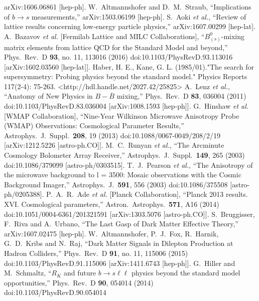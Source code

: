\begin{thebibliography}{xxx}
  arXiv:1606.06861 [hep-ph].
  W.~Altmannshofer and D.~M.~Straub,
  ``Implications of $b\to s$ measurements,''
  arXiv:1503.06199 [hep-ph].
  S.~Aoki {\it et al.},
  ``Review of lattice results concerning low-energy particle physics,''
  arXiv:1607.00299 [hep-lat]. 
  A.~Bazavov {\it et al.} [Fermilab Lattice and MILC Collaborations],
  ``$B^0_{(s)}$-mixing matrix elements from lattice QCD for the Standard Model and beyond,''
  Phys.\ Rev.\ D {\bf 93}, no. 11, 113016 (2016)
  doi:10.1103/PhysRevD.93.113016
  [arXiv:1602.03560 [hep-lat]].
  Haber, H. E., Kane, G. L. (1985/01)."The search for supersymmetry: Probing physics beyond the standard model." Physics Reports 117(2-4): 75-263. <http://hdl.handle.net/2027.42/25825>
  A.~Lenz {\it et al.},
  ``Anatomy of New Physics in $B - \bar{B}$ mixing,''
  Phys.\ Rev.\ D {\bf 83}, 036004 (2011)
  doi:10.1103/PhysRevD.83.036004
  [arXiv:1008.1593 [hep-ph]]. 
  G.~Hinshaw {\it et al.} [WMAP Collaboration],
  ``Nine-Year Wilkinson Microwave Anisotropy Probe (WMAP) Observations: Cosmological Parameter Results,''
  Astrophys.\ J.\ Suppl.\  {\bf 208}, 19 (2013)
  doi:10.1088/0067-0049/208/2/19
  [arXiv:1212.5226 [astro-ph.CO]].
   M.~C.~Runyan {\it et al.},
  ``The Arcminute Cosmology Bolometer Array Receiver,''
  Astrophys.\ J.\ Suppl.\  {\bf 149}, 265 (2003)
  doi:10.1086/379099
  [astro-ph/0303515].
   T.~J.~Pearson {\it et al.},
  ``The Anisotropy of the microwave background to l = 3500: Mosaic observations with the Cosmic Background Imager,''
  Astrophys.\ J.\  {\bf 591}, 556 (2003)
  doi:10.1086/375508
  [astro-ph/0205388].
   P.~A.~R.~Ade {\it et al.} [Planck Collaboration],
  ``Planck 2013 results. XVI. Cosmological parameters,''
  Astron.\ Astrophys.\  {\bf 571}, A16 (2014)
  doi:10.1051/0004-6361/201321591
  [arXiv:1303.5076 [astro-ph.CO]].
    S.~Bruggisser, F.~Riva and A.~Urbano,
  ``The Last Gasp of Dark Matter Effective Theory,''
  arXiv:1607.02475 [hep-ph].
    W.~Altmannshofer, P.~J.~Fox, R.~Harnik, G.~D.~Kribs and N.~Raj,
  ``Dark Matter Signals in Dilepton Production at Hadron Colliders,''
  Phys.\ Rev.\ D {\bf 91}, no. 11, 115006 (2015)
  doi:10.1103/PhysRevD.91.115006
  [arXiv:1411.6743 [hep-ph]].
    G.~Hiller and M.~Schmaltz,
  ``$R_K$ and future $b \to s \ell \ell$ physics beyond the standard model opportunities,''
  Phys.\ Rev.\ D {\bf 90}, 054014 (2014)
  doi:10.1103/PhysRevD.90.054014

\end{thebibliography}
